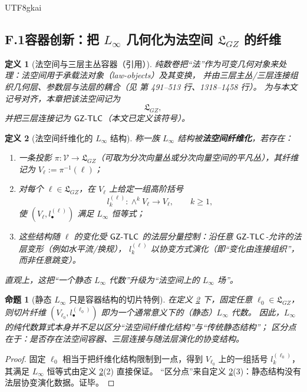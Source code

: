 \documentclass[12pt]{article}
\newtheorem{definition}{定义}[section]
\newtheorem{proposition}{命题}[section]
\begin{document}
\begin{CJK*}{UTF8}{gkai}
\subsection{F.1\;容器创新：把 $L_\infty$ 几何化为法空间 $\mathfrak{L}_{GZ}$ 的纤维}

\begin{definition}[法空间与三层主丛容器（引用）]\label{def:F-container}
纯数卷把“法”作为可变几何对象来处理：法空间用于承载法对象（law-objects）及其变换，
并由三层主丛/三层连接组织几何层、参数层与法层的耦合（见 \cite{GaoZheng2025GFramework} 第 491--513 行、1318--1458 行）。
为与本文记号对齐，本章把该法空间记为
\[
  \mathfrak{L}_{GZ},
\]
并把三层连接记为 $\mathsf{GZ\text{-}TLC}$（本文已定义该符号）。
\end{definition}

\begin{definition}[法空间纤维化的 $L_\infty$ 结构]\label{def:F-law-fibered-linfty}
称一族 $L_\infty$ 结构被\textbf{法空间纤维化}，若存在：
\begin{enumerate}
  \item 一条投影 $\pi:\mathcal{V}\to \mathfrak{L}_{GZ}$（可取为分次向量丛或分次向量空间的平凡丛），其纤维记为 $V_\ell:=\pi^{-1}(\ell)$；
  \item 对每个 $\ell\in\mathfrak{L}_{GZ}$，在 $V_\ell$ 上给定一组高阶括号
        \[
          l_k^{(\ell)}:\wedge^k V_\ell \longrightarrow V_\ell,\qquad k\ge 1,
        \]
        使 $(V_\ell,l_\bullet^{(\ell)})$ 满足 $L_\infty$ 恒等式；
  \item 这些结构随 $\ell$ 的变化受 $\mathsf{GZ\text{-}TLC}$ 的法层分量控制：沿任意 $\mathsf{GZ\text{-}TLC}$-允许的法层变形（例如水平流/换规），
        $l_k^{(\ell)}$ 以协变方式演化（即“变化由连接组织”，而非任意跳变）。
\end{enumerate}
直观上，这把“一个静态 $L_\infty$ 代数”升级为“法空间上的 $L_\infty$ 场”。
\end{definition}

\begin{proposition}[静态 $L_\infty$ 只是容器结构的切片特例]\label{prop:F-slice-special-case}
在定义 \ref{def:F-law-fibered-linfty} 下，固定任意 $\ell_0\in\mathfrak{L}_{GZ}$，
则切片纤维 $(V_{\ell_0},l_\bullet^{(\ell_0)})$ 即为一个通常意义下的（静态）$L_\infty$ 代数。
因此，\emph{$L_\infty$ 的纯代数算式本身并不足以区分“法空间纤维化结构”与“传统静态结构”}；
区分点在于：是否存在法空间容器、三层连接与随法层演化的协变结构。
\end{proposition}

\begin{proof}
固定 $\ell_0$ 相当于把纤维化结构限制到一点，得到 $V_{\ell_0}$ 上的一组括号 $l_k^{(\ell_0)}$，
其满足 $L_\infty$ 恒等式由定义 \ref{def:F-law-fibered-linfty}(2) 直接保证。
“区分点”来自定义 \ref{def:F-law-fibered-linfty}(3)：静态结构没有法层协变演化数据。证毕。
\end{proof}


\end{CJK*}
\end{document}
